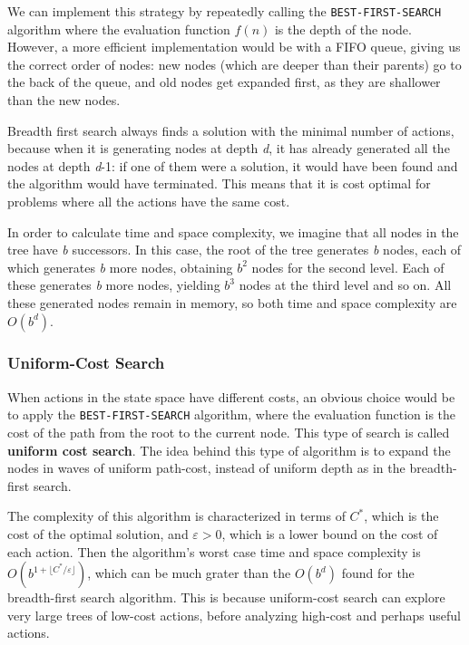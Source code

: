 \documentclass{article}
\begin{document}
We can implement this strategy by repeatedly calling the \lstinline{BEST-FIRST-SEARCH} algorithm where the evaluation function \(f(n)\) is the depth of the node. However, a more efficient implementation would be with a FIFO queue, giving us the correct order of nodes: new nodes (which are deeper than their parents) go to the back of the queue, and old nodes get expanded first, as they are shallower than the new nodes.

Breadth first search always finds a solution with the minimal number of actions, because when it is generating nodes at depth \textit{d}, it has already generated all the nodes at depth \textit{d}-1: if one of them were a solution, it would have been found and the algorithm would have terminated. This means that it is cost optimal for problems where all the actions have the same cost.

In order to calculate time and space complexity, we imagine that all nodes in the tree have \textit{b} successors. In this case, the root of the tree generates \textit{b} nodes, each of which generates \textit{b} more nodes, obtaining \(b^2\) nodes for the second level. Each of these generates \textit{b} more nodes, yielding \(b^3\) nodes at the third level and so on. All these generated nodes remain in memory, so both time and space complexity are \(O(b^d)\).

\subsubsection{Uniform-Cost Search}
When actions in the state space have different costs, an obvious choice would be to apply the \lstinline{BEST-FIRST-SEARCH} algorithm, where the evaluation function is the cost of the path from the root to the current node. This type of search is called \textbf{uniform cost search}. The idea behind this type of algorithm is to expand the nodes in waves of uniform path-cost, instead of uniform depth as in the breadth-first search.

The complexity of this algorithm is characterized in terms of \(C^*\), which is the cost of the optimal solution, and \(\varepsilon > 0\), which is a lower bound on the cost of each action. Then the algorithm's worst case time and space complexity is \(O(b^{1+\lfloor C^*/\varepsilon \rfloor})\), which can be much grater than the \(O(b^d)\) found for the breadth-first search algorithm. This is because uniform-cost search can explore very large trees of low-cost actions, before analyzing high-cost and perhaps useful actions.
\end{document}
